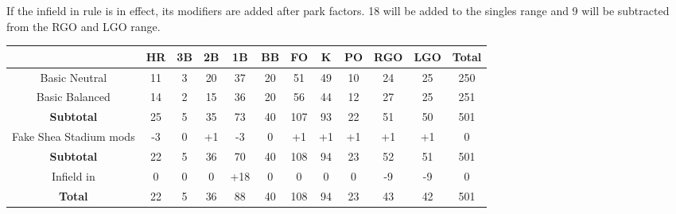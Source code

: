 

If the infield in rule is in effect, its modifiers are added after park factors. 18 will be added to the singles range and 9 will be subtracted from the RGO and LGO range.

\begin{center}
    \begin{tabular}{|c|c|c|c|c|c|c|c|c|c|c|c|}
		\hline 
		              & HR & 3B & 2B & 1B & BB & FO & K  & PO & RGO & LGO & Total \\
		\hline 
	        	Basic Neutral & 11 & 3  & 20 & 37 & 20 & 51 & 49 & 10 & 24  & 25  & 250   \\
		\hline
		Basic Balanced & 14 & 2  & 15 & 36 & 20 & 56 & 44 & 12 & 27  & 25  & 251   \\
		\hline
		\textbf{Subtotal} & 25 & 5  & 35 & 73 & 40 & 107 & 93 & 22 & 51  & 50  & 501   \\
		\hline \hline
		Fake Shea Stadium mods & -3 & 0 & +1 & -3 & 0 & +1 & +1 & +1 & +1 & +1 & 0 \\
		\hline
		\textbf{Subtotal} & 22 & 5 & 36 & 70 & 40 & 108 & 94 & 23 & 52 & 51 & 501 \\ 
	        	\hline \hline
		Infield in & 0 & 0 & 0 & +18 & 0 & 0 & 0 & 0 & -9 & -9 & 0 \\
		\hline
	        	\textbf{Total}  & 22 & 5  & 36 & 88 & 40 & 108 & 94 & 23 & 43  & 42  & 501   \\
	        	\hline 
    \end{tabular}
\end{center}
